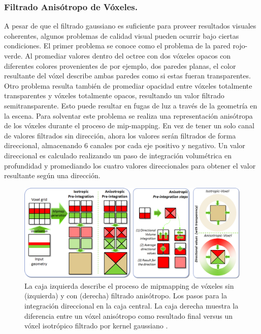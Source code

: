 \subsubsection{Filtrado Anisótropo de Vóxeles.}
\label{subsub:aniso_voxels_orig}
A pesar de que el filtrado gaussiano es suficiente para proveer resultados visuales coherentes, algunos problemas de calidad visual pueden ocurrir bajo ciertas condiciones. El primer problema se conoce como el problema de la pared rojo-verde. Al promediar valores dentro del octree con dos vóxeles opacos con diferentes colores provenientes de por ejemplo, dos paredes planas, el color resultante del vóxel describe ambas paredes como si estas fueran transparentes. Otro problema resulta también de promediar opacidad entre vóxeles totalmente transparentes y vóxeles totalmente opacos, resultando un valor filtrado semitransparente. Esto puede resultar en fugas de luz a través de la geometría en la escena.
Para solventar este problema se realiza una representación anisótropa de los vóxeles durante el proceso de mip-mapping. En vez de tener un solo canal de valores filtrados sin dirección, ahora los valores serán filtrados de forma direccional, almacenando 6 canales por cada eje positivo y negativo. Un valor direccional es calculado realizando un paso de integración volumétrica en profundidad y promediando los cuatro valores direccionales para obtener el valor resultante según una dirección.

\begin{figure}[H]
	\centering
	\includegraphics[width=0.95\linewidth]{media/image23177.png}
	\caption{La caja izquierda describe el proceso de mipmapping de vóxeles sin (izquierda) y con (derecha) filtrado anisótropo. Los pasos para la integración direccional en la caja central. La caja derecha muestra la diferencia entre un vóxel anisótropo como resultado final versus un vóxel isotrópico filtrado por kernel gaussiano \cite{CNSGE11b}.}
	\label{fig:vct_anisofiltering}
\end{figure}

